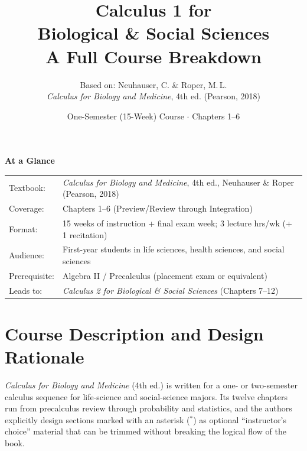 \documentclass[11pt]{article}
\title{\vspace{-1.5cm}\textcolor{primary}{\huge\bfseries Calculus 1 for\\ Biological \& Social Sciences}\\[6pt]
\textcolor{secondary}{\Large A Full Course Breakdown}}
\author{\normalsize Based on: Neuhauser, C. \& Roper, M.\,L.\\ \emph{Calculus for Biology and Medicine}, 4th ed. (Pearson, 2018)}
\date{One-Semester (15-Week) Course $\cdot$ Chapters 1--6}
\newcommand{\opt}{$^{\ast}$}
\begin{document}
\maketitle
\thispagestyle{empty}

\begin{center}
\begin{tcolorbox}[enhanced, colback=soft, colframe=primary,
  arc=3pt, boxrule=0.7pt]
\centering
\textbf{At a Glance} \\[4pt]
\begin{tabular}{>{\raggedleft\arraybackslash}p{2.2cm} P{11.3cm}}
Textbook: & \emph{Calculus for Biology and Medicine}, 4th ed., Neuhauser \& Roper (Pearson, 2018) \\
Coverage: & Chapters 1--6 (Preview/Review through Integration) \\
Format: & 15 weeks of instruction + final exam week; 3 lecture hrs/wk (+ 1 recitation) \\
Audience: & First-year students in life sciences, health sciences, and social sciences \\
Prerequisite: & Algebra II / Precalculus (placement exam or equivalent) \\
Leads to: & \emph{Calculus 2 for Biological \& Social Sciences} (Chapters 7--12) \\
\end{tabular}
\end{tcolorbox}
\end{center}

\vspace{0.3cm}
\tableofcontents

\newpage

\section{Course Description and Design Rationale}

\emph{Calculus for Biology and Medicine} (4th ed.) is written for a one- or two-semester
calculus sequence for life-science and social-science majors. Its twelve chapters run from
precalculus review through probability and statistics, and the authors explicitly design
sections marked with an asterisk (\opt) as optional ``instructor's choice'' material that
can be trimmed without breaking the logical flow of the book.
\end{document}
